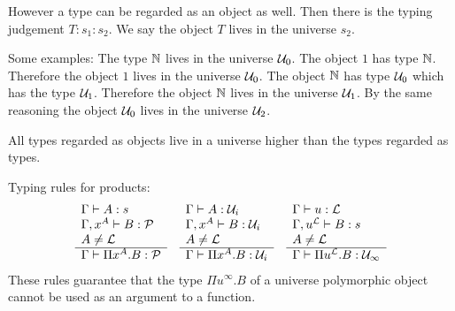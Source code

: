 However a type can be regarded as an object as well. Then there is the typing
judgement $T: s_1 : s_2$. We say the object $T$ lives in the universe $s_2$.

Some examples: The type ${\mathbb N}$ lives in the universe ${\cal U}_0$. The object $1$
has type ${\mathbb N}$. Therefore the object $1$ lives in the universe ${\cal U}_0$. The
object ${\mathbb N}$ has type ${\cal U}_0$ which has the type ${\cal U}_1$. Therefore the
object ${\mathbb N}$ lives in the universe ${\cal U}_1$. By the same reasoning the object
${\cal U}_0$ lives in the universe ${\cal U}_2$.

All types regarded as objects live in a universe higher than the types regarded
as types.


Typing rules for products:
$$
\begin{array}{lll}
    \begin{array}{l} 
        \Gamma \vdash A: s
        \\
        \Gamma, x^A \vdash B: {\cal P}
        \\
        A \ne {\cal L}
     \\ \hline 
        \Gamma \vdash \Pi x^A. B : {\cal P}
     \end{array}
    &
    \begin{array}{l} 
        \Gamma \vdash A: {\cal U}_i
        \\
        \Gamma, x^A \vdash B: {\cal U}_i
        \\
        A \ne {\cal L}
     \\ \hline 
        \Gamma \vdash \Pi x^A. B : {\cal U}_i
     \end{array}
    &
    \begin{array}{l} 
        \Gamma \vdash u: {\cal L}
        \\
        \Gamma, u^{\cal L} \vdash B: s
        \\
        A \ne {\cal L}
     \\ \hline 
        \Gamma \vdash \Pi u^{\cal L}. B : {\cal U}_\infty
     \end{array}
\end{array}
$$
These rules guarantee that the type $\Pi u^\infty. B$ of a universe polymorphic
object cannot be used as an argument to a function.
